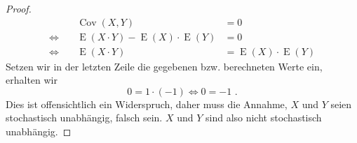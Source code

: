 \documentclass[a4paper]{scrartcl}
\newcommand{\gdw}{\Leftrightarrow}
\newcommand{\cov}{\operatorname{Cov}}
\newcommand{\e}{\operatorname{E}}
\begin{document}
\begin{enumerate}[label=\bfseries\arabic*.]
\begin{proof}
            \begin{equation*}
                \begin{alignedat}{2}
                    && \cov(X, Y) &= 0 \\
                    \gdw\ && \e(X \cdot Y) - \e(X) \cdot \e(Y) &= 0 \\
                    \gdw\ && \e(X \cdot Y) &= \e(X) \cdot \e(Y)
                \end{alignedat}
            \end{equation*}
            Setzen wir in der letzten Zeile die gegebenen bzw. berechneten
            Werte ein, erhalten wir
            \begin{equation*}
                0 = 1 \cdot (-1)
                \gdw 0 = -1 \text{ .}
            \end{equation*}
            Dies ist offensichtlich ein Widerspruch, daher muss die Annahme, $X$
            und $Y$ seien stochastisch unabhängig, falsch sein.
            $X$ und $Y$ sind also nicht stochastisch unabhängig.
        \end{proof}

\end{enumerate}
\end{document}
